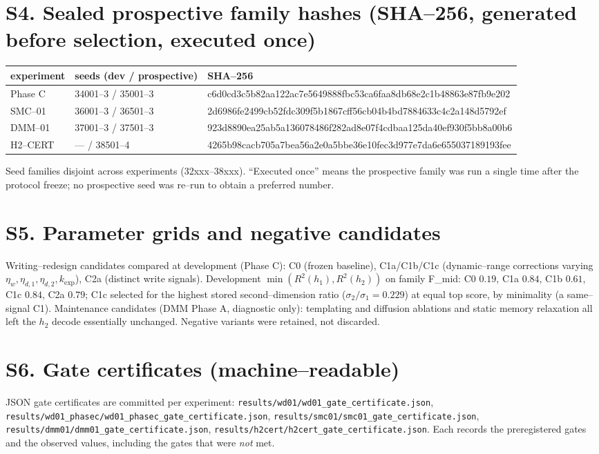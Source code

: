 \documentclass[11pt]{article}
\begin{document}
\section{S4. Sealed prospective family hashes (SHA--256, generated before selection, executed once)}
\begin{longtable}{@{}lll@{}}\toprule experiment & seeds (dev / prospective) & SHA--256\\\midrule
Phase C & 34001--3 / 35001--3 & c6d0cd3c5b82aa122ac7e5649888fbc53ca6faa8db68e2c1b48863e87fb9e202\\
SMC--01 & 36001--3 / 36501--3 & 2d6986fe2499cb52fdc309f5b1867cff56cb04b4bd7884633c4c2a148d5792ef\\
DMM--01 & 37001--3 / 37501--3 & 923d8890ea25ab5a136078486f282ad8e07f4cdbaa125da40ef930f5bb8a00b6\\
H2--CERT & --- / 38501--4 & 4265b98cacb705a7bea56a2e0a5bbe36e10fec3d977e7da6e655037189193fee\\\bottomrule\end{longtable}
Seed families disjoint across experiments (32xxx--38xxx). ``Executed once'' means the prospective family was
run a single time after the protocol freeze; no prospective seed was re--run to obtain a preferred number.

\section{S5. Parameter grids and negative candidates}
Writing--redesign candidates compared at development (Phase C): C0 (frozen baseline), C1a/C1b/C1c
(dynamic--range corrections varying $\eta_w,\eta_{d,1},\eta_{d,2},k_{\exp}$), C2a (distinct write signals).
Development $\min(R^2(h_1),R^2(h_2))$ on family F\_mid: C0 $0.19$, C1a $0.84$, C1b $0.61$, C1c $0.84$,
C2a $0.79$; C1c selected for the highest stored second--dimension ratio ($\sigma_2/\sigma_1=0.229$) at
equal top score, by minimality (a same--signal C1). Maintenance candidates (DMM Phase A, diagnostic only):
templating and diffusion ablations and static memory relaxation all left the $h_2$ decode essentially
unchanged. Negative variants were retained, not discarded.

\section{S6. Gate certificates (machine--readable)}
JSON gate certificates are committed per experiment: \texttt{results/wd01/wd01\_gate\_certificate.json},
\texttt{results/wd01\_phasec/wd01\_phasec\_gate\_certificate.json},
\texttt{results/smc01/smc01\_gate\_certificate.json},
\texttt{results/dmm01/dmm01\_gate\_certificate.json},
\texttt{results/h2cert/h2cert\_gate\_certificate.json}. Each records the preregistered gates and the observed
values, including the gates that were \emph{not} met.
\end{document}
